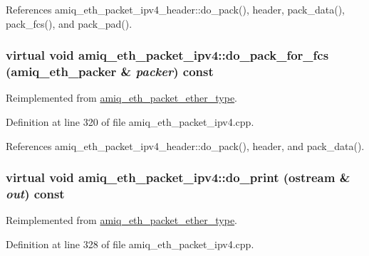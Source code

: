 References amiq\_\-eth\_\-packet\_\-ipv4\_\-header::do\_\-pack(), header, pack\_\-data(), pack\_\-fcs(), and pack\_\-pad().\hypertarget{classamiq__eth__packet__ipv4_a9292f2b244e6baae39ba4aeea7b97e8f}{
\subsubsection[{do\_\-pack\_\-for\_\-fcs}]{\setlength{\rightskip}{0pt plus 5cm}virtual void amiq\_\-eth\_\-packet\_\-ipv4::do\_\-pack\_\-for\_\-fcs ({\bf amiq\_\-eth\_\-packer} \& {\em packer}) const}}
\label{classamiq__eth__packet__ipv4_a9292f2b244e6baae39ba4aeea7b97e8f}


Reimplemented from \hyperlink{classamiq__eth__packet__ether__type_aaa85cf778650e1c1b377392a975cb7bc}{amiq\_\-eth\_\-packet\_\-ether\_\-type}.

Definition at line 320 of file amiq\_\-eth\_\-packet\_\-ipv4.cpp.

References amiq\_\-eth\_\-packet\_\-ipv4\_\-header::do\_\-pack(), header, and pack\_\-data().\hypertarget{classamiq__eth__packet__ipv4_a5e93e2455918061cdc524f30626d4043}{
\subsubsection[{do\_\-print}]{\setlength{\rightskip}{0pt plus 5cm}virtual void amiq\_\-eth\_\-packet\_\-ipv4::do\_\-print (ostream \& {\em out}) const}}
\label{classamiq__eth__packet__ipv4_a5e93e2455918061cdc524f30626d4043}


Reimplemented from \hyperlink{classamiq__eth__packet__ether__type_a9b2852fa1aaf278138fde2232e446f63}{amiq\_\-eth\_\-packet\_\-ether\_\-type}.

Definition at line 328 of file amiq\_\-eth\_\-packet\_\-ipv4.cpp.

